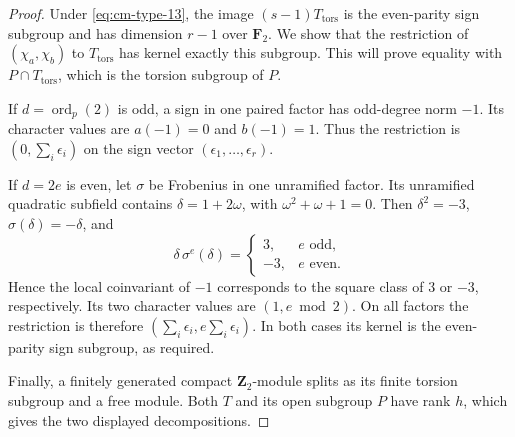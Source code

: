 \begin{proof}
Under \eqref{eq:cm-type-13}, the image \((s-1)T_{\mathrm{tors}}\) is the
even-parity sign subgroup and has dimension \(r-1\) over
\(\mathbf F_2\). We show that the restriction of
\((\chi_a,\chi_b)\) to \(T_{\mathrm{tors}}\) has kernel
exactly this subgroup. This will prove equality with
\(P\cap T_{\mathrm{tors}}\), which is the torsion subgroup
of \(P\).

If \(d=\operatorname{ord}_p(2)\) is odd, a sign in one paired
factor has odd-degree norm \(-1\). Its character values are
\(a(-1)=0\) and \(b(-1)=1\). Thus the restriction is
\((0,\sum_i\epsilon_i)\) on the sign vector
\((\epsilon_1,\ldots,\epsilon_r)\).

If \(d=2e\) is even, let \(\sigma\) be Frobenius in one
unramified factor. Its unramified quadratic subfield contains
\(\delta=1+2\omega\), with \(\omega^2+\omega+1=0\).
Then \(\delta^2=-3\), \(\sigma(\delta)=-\delta\), and
\[
 \delta\,\sigma^e(\delta)=
 \begin{cases}3,&e\text{ odd},\\-3,&e\text{ even}.
 \end{cases}
\]
Hence the local coinvariant of \(-1\) corresponds to the
square class of \(3\) or \(-3\), respectively. Its two
character values are \((1,e\bmod2)\). On all factors the
restriction is therefore
\((\sum_i\epsilon_i,e\sum_i\epsilon_i)\). In both cases
its kernel is the even-parity sign subgroup, as required.

Finally, a finitely generated compact \(\mathbf Z_2\)-module
splits as its finite torsion subgroup and a free module.
Both \(T\) and its open subgroup \(P\) have rank \(h\),
which gives the two displayed decompositions.
\end{proof}
